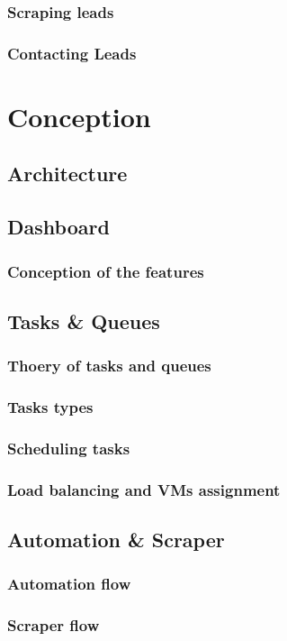 \subsubsection{Scraping leads}
\subsubsection{Contacting Leads}

\section{Conception}
\subsection{Architecture}
\subsection{Dashboard}
\subsubsection{Conception of the features}
\subsection{Tasks \& Queues}
\subsubsection{Thoery of tasks and queues}
\subsubsection{Tasks types}
\subsubsection{Scheduling tasks}
\subsubsection{Load balancing and VMs assignment }
\subsection{Automation \& Scraper}
\subsubsection{Automation flow}
\subsubsection{Scraper flow}
